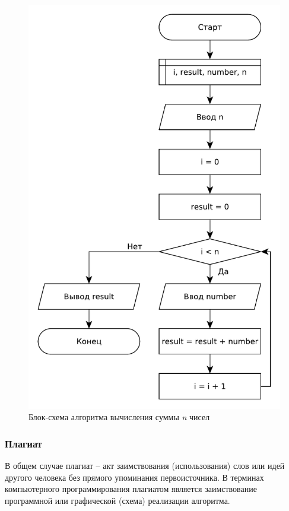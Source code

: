 \begin{figure}[h!btp]
	\centering
	\includegraphics[width=380pt]{inc/sum-n-scheme.pdf}
	\caption{Блок-схема алгоритма вычисления суммы \textit{n} чисел}
	\label{fig:sum-n-scheme}	
\end{figure}

\clearpage

\subsubsection{Плагиат}

В общем случае плагиат -- акт заимствования (использования) слов или идей другого человека без прямого упоминания первоисточника\cite{thesaurus}. В терминах компьютерного программирования плагиатом является заимствование программной или графической (схема) реализации алгоритма.

